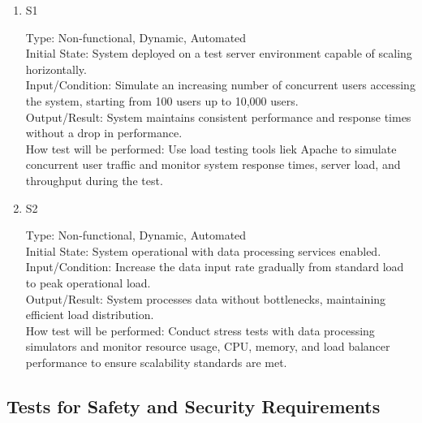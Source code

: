 \documentclass[12pt, titlepage]{article}
\begin{document}
\begin{enumerate}

    \item{S1\\}
    
    Type: Non-functional, Dynamic, Automated\\
    
    Initial State: System deployed on a test server environment capable of scaling horizontally.\\
    
    Input/Condition: Simulate an increasing number of concurrent users accessing the system, starting from 100 users up to 10,000 users.\\
    
    Output/Result: System maintains consistent performance and response times without a drop in performance.\\
    
    How test will be performed: Use load testing tools liek Apache to simulate concurrent user traffic and monitor system response times, server load, and throughput during the test.
    
    \item{S2\\}
    
    Type: Non-functional, Dynamic, Automated\\
    
    Initial State: System operational with data processing services enabled.\\
    
    Input/Condition: Increase the data input rate gradually from standard load to peak operational load.\\
    
    Output/Result: System processes data without bottlenecks, maintaining efficient load distribution.\\
    
    How test will be performed: Conduct stress tests with data processing simulators and monitor resource usage, CPU, memory, and load balancer performance to ensure scalability standards are met.
    
\end{enumerate}

\subsection{Tests for Safety and Security Requirements}
\end{document}
